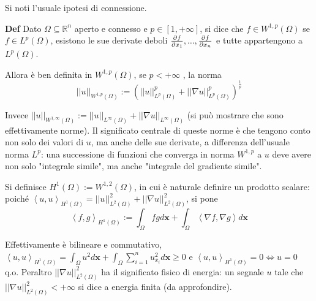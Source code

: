 \documentclass{article}
\begin{document}
Si noti l'usuale ipotesi di connessione.


\textbf{Def} Dato $\Omega \subseteq 
\mathbb{R}
^{n}$ aperto e connesso e $p\in \left[ 1,+\infty \right] $, si dice che $%
f\in W^{1,p}\left( \Omega \right) $ se $f\in L^{p}\left( \Omega \right) $,
esistono le sue derivate deboli $\frac{\partial f}{\partial x_{1}},...,\frac{%
\partial f}{\partial x_{n}}$ e tutte appartengono a $L^{p}\left( \Omega
\right) $.

Allora \`{e} ben definita in $W^{1,p}\left( \Omega \right) $, se $p<+\infty $%
, la norma%
\begin{equation*}
\left\vert \left\vert u\right\vert \right\vert _{W^{1,p}\left( \Omega
\right) }:=\left( \left\vert \left\vert u\right\vert \right\vert
_{L^{p}\left( \Omega \right) }^{p}+\left\vert \left\vert \nabla u\right\vert
\right\vert _{L^{p}\left( \Omega \right) }^{p}\right) ^{\frac{1}{p}}
\end{equation*}

Invece $\left\vert \left\vert u\right\vert \right\vert _{W^{1,\infty }\left(
\Omega \right) }:=\left\vert \left\vert u\right\vert \right\vert _{L^{\infty
}\left( \Omega \right) }+\left\vert \left\vert \nabla u\right\vert
\right\vert _{L^{\infty }\left( \Omega \right) }$ (si pu\`{o} mostrare che
sono effettivamente norme). Il significato centrale di queste norme \`{e}
che tengono conto non solo dei valori di $u$, ma anche delle sue derivate, a
differenza dell'usuale norma $L^{p}$: una successione di funzioni che
converga in norma $W^{1,p}$ a $u$ deve avere non solo "integrale simile", ma
anche "integrale del gradiente simile".

Si definisce $H^{1}\left( \Omega \right) :=W^{1,2}\left( \Omega \right) $,
in cui \`{e} naturale definire un prodotto scalare: poich\'{e} $\left\langle
u,u\right\rangle _{H^{1}\left( \Omega \right) }=\left\vert \left\vert
u\right\vert \right\vert _{L^{2}\left( \Omega \right) }^{2}+\left\vert
\left\vert \nabla u\right\vert \right\vert _{L^{2}\left( \Omega \right)
}^{2} $, si pone 
\begin{equation*}
\left\langle f,g\right\rangle _{H^{1}\left( \Omega \right) }:=\int_{\Omega
}fgd\mathbf{x}+\int_{\Omega }\left\langle \nabla f,\nabla g\right\rangle d%
\mathbf{x}
\end{equation*}

Effettivamente \`{e} bilineare e commutativo, $\left\langle u,u\right\rangle
_{H^{1}\left( \Omega \right) }=\int_{\Omega }u^{2}d\mathbf{x+}\int_{\Omega
}\sum_{i=1}^{n}u_{x_{i}}^{2}d\mathbf{x}\geq 0$ e $\left\langle
u,u\right\rangle _{H^{1}\left( \Omega \right) }=0\Longleftrightarrow u=0$
q.o. Peraltro $\left\vert \left\vert \nabla u\right\vert \right\vert
_{L^{2}\left( \Omega \right) }^{2}$ ha il significato fisico di energia: un
segnale $u$ tale che $\left\vert \left\vert \nabla u\right\vert \right\vert
_{L^{2}\left( \Omega \right) }^{2}<+\infty $ si dice a energia finita (da
approfondire).
\end{document}

